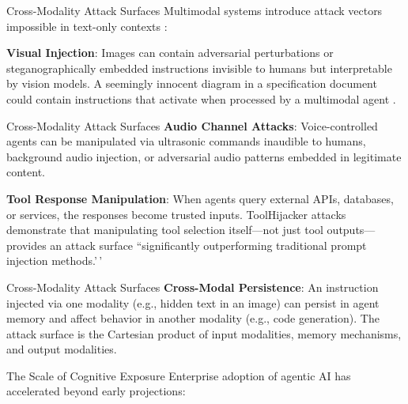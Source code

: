 \documentclass[
  ignorenonframetext,
]{beamer}
\begin{document}
\begin{frame}[allowframebreaks]{Cross-Modality Attack Surfaces}
\protect{}\label{cross-modality-attack-surfaces}
Multimodal systems introduce attack vectors impossible in text-only
contexts \cite{shayegani2023survey}:

\textbf{Visual Injection}: Images can contain adversarial perturbations
or steganographically embedded instructions invisible to humans but
interpretable by vision models. A seemingly innocent diagram in a
specification document could contain instructions that activate when
processed by a multimodal agent \cite{qi2024visual}.

\end{frame}

\begin{frame}[allowframebreaks]{Cross-Modality Attack Surfaces}
\textbf{Audio Channel Attacks}: Voice-controlled agents can be
manipulated via ultrasonic commands inaudible to humans, background
audio injection, or adversarial audio patterns embedded in legitimate
content.

\textbf{Tool Response Manipulation}: When agents query external APIs,
databases, or services, the responses become trusted inputs.
ToolHijacker attacks \cite{toolhijacker2025} demonstrate that
manipulating tool selection itself---not just tool outputs---provides an
attack surface ``significantly outperforming traditional prompt
injection methods.'\,'

\end{frame}

\begin{frame}[allowframebreaks]{Cross-Modality Attack Surfaces}
\textbf{Cross-Modal Persistence}: An instruction injected via one
modality (e.g., hidden text in an image) can persist in agent memory and
affect behavior in another modality (e.g., code generation). The attack
surface is the Cartesian product of input modalities, memory mechanisms,
and output modalities.
\end{frame}

\begin{frame}[allowframebreaks]{The Scale of Cognitive Exposure}
\protect{}\label{the-scale-of-cognitive-exposure}
Enterprise adoption of agentic AI has accelerated beyond early
projections:

\end{frame}
\end{document}

